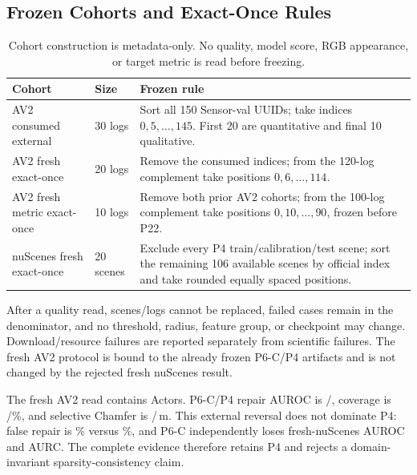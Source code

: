 \subsection{Frozen Cohorts and Exact-Once Rules}

\begin{table}[t]
\centering
\small
\caption{Cohort construction is metadata-only. No quality, model score, RGB appearance, or target metric is read before freezing.}
\begin{tabular}{p{}p{}p{}}
\toprule
Cohort & Size & Frozen rule \\
\midrule
AV2 consumed external & 30 logs & Sort all 150 Sensor-val UUIDs; take indices $0,5,\ldots,145$. First 20 are quantitative and final 10 qualitative. \\
AV2 fresh exact-once & 20 logs & Remove the consumed indices; from the 120-log complement take positions $0,6,\ldots,114$. \\
AV2 fresh metric exact-once & 10 logs & Remove both prior AV2 cohorts; from the 100-log complement take positions $0,10,\ldots,90$, frozen before P22. \\
nuScenes fresh exact-once & 20 scenes & Exclude every P4 train/calibration/test scene; sort the remaining 106 available scenes by official index and take rounded equally spaced positions. \\
\bottomrule
\end{tabular}
\label{legacy:tab:supp-cohorts}
\end{table}

After a quality read, scenes/logs cannot be replaced, failed cases remain in the denominator, and no threshold, radius, feature group,
or checkpoint may change. Download/resource failures are reported separately from scientific failures. The fresh AV2 protocol is bound
to the already frozen P6-C/P4 artifacts and is not changed by the rejected fresh nuScenes result.

The fresh AV2 read contains \PsixFreshActors{} Actors. P6-C/P4 repair AUROC is
\PsixFreshCandidateRepairAUROC{}/\PsixFreshPfourRepairAUROC{}, coverage is
\PsixFreshCandidateCoverage{}/\PsixFreshPfourCoverage{}\%, and selective Chamfer is
\PsixFreshCandidateChamfer{}/\PsixFreshPfourChamfer{}\,m. This external reversal does not dominate P4: false repair is
\PsixFreshCandidateFalseRepair{}\% versus \PsixFreshPfourFalseRepair{}\%, and P6-C independently loses fresh-nuScenes
AUROC and AURC. The complete evidence therefore retains P4 and rejects a domain-invariant sparsity-consistency claim.


